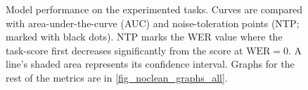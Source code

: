 \begin{figure}[h!]
    \centering
    \hspace{0.2cm}
    \hspace{0.2cm}
    \caption{Model performance on the experimented tasks.
    Curves are compared with area-under-the-curve (AUC) and noise-toleration points (NTP; marked with black dots). NTP marks the WER value where the task-score first decreases significantly from the score at $\text{WER}=0$. A line's shaded area represents its confidence interval. Graphs for the rest of the metrics are in \autoref{fig_noclean_graphs_all}.}
    \label{fig_noclean_graphs}
\end{figure}